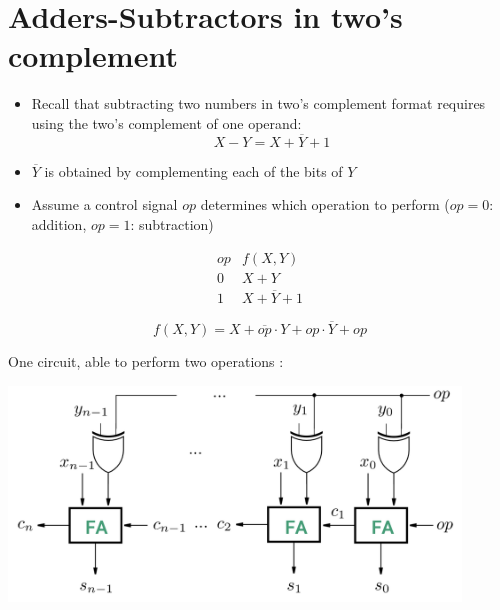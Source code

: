 \documentclass[12pt,openany, tikz,border=10pt]{book}
\begin{document}
			      	\newpage
			      	\section{Adders-Subtractors in two's complement}
			      	\begin{itemize}
			      		\item[] Recall that subtracting two numbers in two's complement format requires using the two's complement of one operand:
			      		      \begin{equation*}
			      		      	X - Y = X + \overline{Y} + 1
			      		      \end{equation*}
			      		\item[] $\overline{Y}$ is obtained by complementing each of the bits of $Y$
			      		\item[] Assume a control signal $op$ determines which operation to perform \newline($op = 0$: addition, $op = 1$: subtraction)
			      	\end{itemize}
			      	  
			      	\[
			      		\begin{array}{c|c}
			      			op & f(X, Y)              \\
			      			\hline
			      			0  & X + Y                \\
			      			1  & X + \overline{Y} + 1 
			      		\end{array}
			      	\]
			      	  
			      	\[
			      		f(X, Y) = X + \overline{op} \cdot Y + op \cdot \overline{Y} + op
			      	\]
			      	
			      	\vspace*{10px}
			      	
			      	One circuit, able to perform two operations :
			      	\begin{center}
			      		\begin{minipage}[c]{0.90\textwidth} %
			      			\centering
			      			\includegraphics[width=0.90\textwidth]{circuits/8.3.png} %
			      		\end{minipage}
			      	\end{center}
			      	
\end{document}

